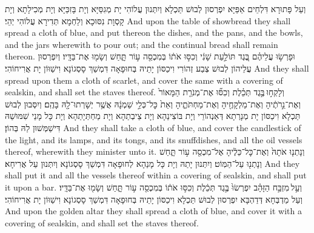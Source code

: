 {וְעַל פָּתוּרָא דִּלְחֵים אַפַּיָּא יִפְרְסוּן לְבוּשׁ תַּכְלָא וְיִתְּנוּן עֲלוֹהִי יָת מְגִסַּיָּא וְיָת בָּזִכַּיָּא וְיָת מְכִילָתָא וְיָת קָסְוָת נִסּוּכָא וְלַחְמָא תְּדִירָא עֲלוֹהִי יְהֵי׃}
{And upon the table of showbread they shall spread a cloth of blue, and put thereon the dishes, and the pans, and the bowls, and the jars wherewith to pour out; and the continual bread shall remain thereon.}{}
{וּפָרְשׂ֣וּ עֲלֵיהֶ֗ם בֶּ֚גֶד תּוֹלַ֣עַת שָׁנִ֔י וְכִסּ֣וּ אֹת֔וֹ בְּמִכְסֵ֖ה ע֣וֹר תָּ֑חַשׁ וְשָׂמ֖וּ אֶת־בַּדָּֽיו׃}
{וְיִפְרְסוּן עֲלֵיהוֹן לְבוּשׁ צְבַע זְהוֹרִי וִיכַסּוֹן יָתֵיהּ בְּחוּפָאָה דִּמְשַׁךְ סָסְגוֹנָא וִישַׁוּוֹן יָת אֲרִיחוֹהִי׃}
{And they shall spread upon them a cloth of scarlet, and cover the same with a covering of sealskin, and shall set the staves thereof.}{}
{וְלָקְח֣וּ \legarmeh  בֶּ֣גֶד תְּכֵ֗לֶת וְכִסּ֞וּ אֶת־מְנֹרַ֤ת הַמָּאוֹר֙ וְאֶת־נֵ֣רֹתֶ֔יהָ וְאֶת־מַלְקָחֶ֖יהָ וְאֶת־מַחְתֹּתֶ֑יהָ וְאֵת֙ כׇּל־כְּלֵ֣י שַׁמְנָ֔הּ אֲשֶׁ֥ר יְשָׁרְתוּ־לָ֖הּ בָּהֶֽם׃
}
{וְיִסְּבוּן לְבוּשׁ תַּכְלָא וִיכַסּוֹן יָת מְנָרְתָא דְּאַנְהוֹרֵי וְיָת בּוֹצִינַהָא וְיָת צֵיבְתַהָא וְיָת מַחְתְּיָתַהָא וְיָת כָּל מָנֵי שִׁמּוּשַׁהּ דִּישַׁמְּשׁוּן לַהּ בְּהוֹן׃}
{And they shall take a cloth of blue, and cover the candlestick of the light, and its lamps, and its tongs, and its snuffdishes, and all the oil vessels thereof, wherewith they minister unto it.}{}
{וְנָתְנ֤וּ אֹתָהּ֙ וְאֶת־כׇּל־כֵּלֶ֔יהָ אֶל־מִכְסֵ֖ה ע֣וֹר תָּ֑חַשׁ וְנָתְנ֖וּ עַל־הַמּֽוֹט׃
}
{וְיִתְּנוּן יָתַהּ וְיָת כָּל מָנַהָא לְחוּפָאָה דִּמְשַׁךְ סָסְגוֹנָא וְיִתְּנוּן עַל אֲרִיחָא׃}
{And they shall put it and all the vessels thereof within a covering of sealskin, and shall put it upon a bar.}{}
{וְעַ֣ל \legarmeh  מִזְבַּ֣ח הַזָּהָ֗ב יִפְרְשׂוּ֙ בֶּ֣גֶד תְּכֵ֔לֶת וְכִסּ֣וּ אֹת֔וֹ בְּמִכְסֵ֖ה ע֣וֹר תָּ֑חַשׁ וְשָׂמ֖וּ אֶת־בַּדָּֽיו׃}
{וְעַל מַדְבְּחָא דְּדַהְבָּא יִפְרְסוּן לְבוּשׁ תַּכְלָא וִיכַסּוֹן יָתֵיהּ בְּחוּפָאָה דִּמְשַׁךְ סָסְגוֹנָא וִישַׁוּוֹן יָת אֲרִיחוֹהִי׃}
{And upon the golden altar they shall spread a cloth of blue, and cover it with a covering of sealskin, and shall set the staves thereof.}{}
